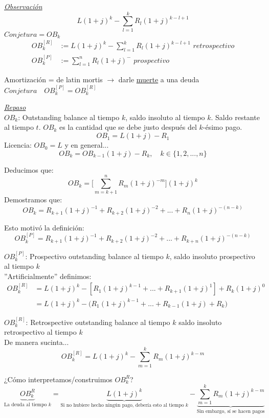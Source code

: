 \textit{\underline{Observación}}
$$L(1+j)^k - \sum_{l=1}^k R_{l}(1+j)^{k-l+1}$$
$Conjetura=OB_k$
\begin{align*}
    OB_k^{[R]} &:= L(1+j)^k - \sum_{l=1}^k R_{l}(1+j)^{k-l+1} \textit{ retrospectivo}\\
    OB_k^{[P]} &:= \sum_{l=1}^n R_{l}(1+j)^{-} \textit{ prospectivo}
\end{align*}

Amortización = de latin mortis $\rightarrow$ darle \underline{muerte} a una deuda\\
$Conjetura\quad OB_k^{[P]} = OB_k^{[R]}$

\textit{\underline{Repaso}}\\
$OB_{k}$: Outstanding balance al tiempo $k$, saldo insoluto al tiempo $k$. Saldo restante al tiempo $t$. $OB_k$ es la cantidad que se debe justo después del $k$-ésimo pago.\\
$$OB_1 = L(1+j) - R_1$$
Licencia: $OB_0=L$ y en general...
$$OB_k= OB_{k-1}(1+j) - R_k,\quad k\in\{1,2,...,n\}$$

Deducimos que:
$$OB_k = \big[ \sum_{m=k+1}^n R_m(1+j)^{-m}\big](1+j)^k$$
Demostramos que:
$$OB_k = R_{k+1}(1+j)^{-1} + R_{k+2}(1+j)^{-2}+...+ R_n(1+j)^{-(n-k)}$$

Esto motivó la definición:
$$ OB_k^{[P]} = R_{k+1}(1+j)^{-1} + R_{k+2}(1+j)^{-2} + ... + R_{k+n}(1+j)^{-(n-k)}$$

$OB_k^{[P]}$: Prospectivo outstanding balance al tiempo $k$, saldo insoluto prospectivo al tiempo $k$\\

''Artificialmente'' definimos:
\begin{align*}
    OB_{k}^{[R]} &= L(1+j)^k - [R_1(1+j)^{k-1} + ... + R_{k+1}(1+j)^1] + R_k(1+j)^0\\
    &= L(1+j)^k - \big( R_1(1+j)^{k-1} + ... + R_{k-1}(1+j) + R_k \big)
\end{align*}

$OB_k^{[R]}$: Retrospective outstanding balance al tiempo $k$ saldo insoluto retrospectivo al tiempo $k$\\

De manera sucinta...
$$OB_k^{[R]} = L(1+j)^k - \sum_{m=1}^kR_m(1+j)^{k-m}$$

¿Cómo interpretamos/construimos $OB_k^{R}$?
$$\underbrace{OB_k^{R}}_{\text{La deuda al tiempo }k} = \underbrace{L(1+j)^k}_{\text{Si no hubiere hecho ningún pago, debería esto al tiempo }k} - \underbrace{\sum_{m=1}^k R_m(1+j)^{k-m}}_{\text{Sin embargo, sí se hacen pagos}}$$

